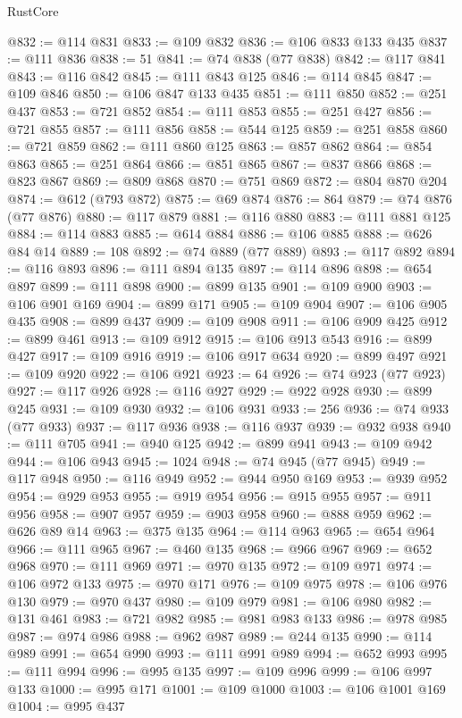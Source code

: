 \begin{lexlean}{RustCore}
\begin{coremodule}
@832 := @114 @831
@833 := @109 @832
@836 := @106 @833 @133 @435
@837 := @111 @836
@838 := 51
@841 := @74 @838 (@77 @838)
@842 := @117 @841
@843 := @116 @842
@845 := @111 @843 @125
@846 := @114 @845
@847 := @109 @846
@850 := @106 @847 @133 @435
@851 := @111 @850
@852 := @251 @437
@853 := @721 @852
@854 := @111 @853
@855 := @251 @427
@856 := @721 @855
@857 := @111 @856
@858 := @544 @125
@859 := @251 @858
@860 := @721 @859
@862 := @111 @860 @125
@863 := @857 @862
@864 := @854 @863
@865 := @251 @864
@866 := @851 @865
@867 := @837 @866
@868 := @823 @867
@869 := @809 @868
@870 := @751 @869
@872 := @804 @870 @204
@874 := @612 (@793 @872)
@875 := @69 @874
@876 := 864
@879 := @74 @876 (@77 @876)
@880 := @117 @879
@881 := @116 @880
@883 := @111 @881 @125
@884 := @114 @883
@885 := @614 @884
@886 := @106 @885
@888 := @626 @84 @14
@889 := 108
@892 := @74 @889 (@77 @889)
@893 := @117 @892
@894 := @116 @893
@896 := @111 @894 @135
@897 := @114 @896
@898 := @654 @897
@899 := @111 @898
@900 := @899 @135
@901 := @109 @900
@903 := @106 @901 @169
@904 := @899 @171
@905 := @109 @904
@907 := @106 @905 @435
@908 := @899 @437
@909 := @109 @908
@911 := @106 @909 @425
@912 := @899 @461
@913 := @109 @912
@915 := @106 @913 @543
@916 := @899 @427
@917 := @109 @916
@919 := @106 @917 @634
@920 := @899 @497
@921 := @109 @920
@922 := @106 @921
@923 := 64
@926 := @74 @923 (@77 @923)
@927 := @117 @926
@928 := @116 @927
@929 := @922 @928
@930 := @899 @245
@931 := @109 @930
@932 := @106 @931
@933 := 256
@936 := @74 @933 (@77 @933)
@937 := @117 @936
@938 := @116 @937
@939 := @932 @938
@940 := @111 @705
@941 := @940 @125
@942 := @899 @941
@943 := @109 @942
@944 := @106 @943
@945 := 1024
@948 := @74 @945 (@77 @945)
@949 := @117 @948
@950 := @116 @949
@952 := @944 @950 @169
@953 := @939 @952
@954 := @929 @953
@955 := @919 @954
@956 := @915 @955
@957 := @911 @956
@958 := @907 @957
@959 := @903 @958
@960 := @888 @959
@962 := @626 @89 @14
@963 := @375 @135
@964 := @114 @963
@965 := @654 @964
@966 := @111 @965
@967 := @460 @135
@968 := @966 @967
@969 := @652 @968
@970 := @111 @969
@971 := @970 @135
@972 := @109 @971
@974 := @106 @972 @133
@975 := @970 @171
@976 := @109 @975
@978 := @106 @976 @130
@979 := @970 @437
@980 := @109 @979
@981 := @106 @980
@982 := @131 @461
@983 := @721 @982
@985 := @981 @983 @133
@986 := @978 @985
@987 := @974 @986
@988 := @962 @987
@989 := @244 @135
@990 := @114 @989
@991 := @654 @990
@993 := @111 @991 @989
@994 := @652 @993
@995 := @111 @994
@996 := @995 @135
@997 := @109 @996
@999 := @106 @997 @133
@1000 := @995 @171
@1001 := @109 @1000
@1003 := @106 @1001 @169
@1004 := @995 @437

\end{coremodule}
\end{lexlean}
